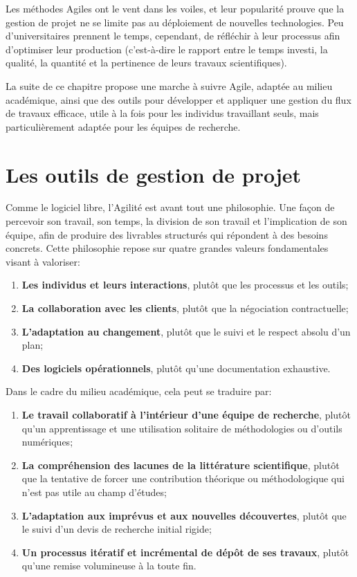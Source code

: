 \documentclass[
  letterpaper,
  DIV=11,
  numbers=noendperiod]{scrreprt}
\providecommand{\tightlist}{%
  \setlength{\itemsep}{0pt}\setlength{\parskip}{0pt}}\usepackage{longtable,booktabs,array}
\begin{document}
Les méthodes Agiles ont le vent dans les voiles, et leur popularité
prouve que la gestion de projet ne se limite pas au déploiement de
nouvelles technologies. Peu d'universitaires prennent le temps,
cependant, de réfléchir à leur processus afin d'optimiser leur
production (c'est-à-dire le rapport entre le temps investi, la qualité,
la quantité et la pertinence de leurs travaux scientifiques).

La suite de ce chapitre propose une marche à suivre Agile, adaptée au
milieu académique, ainsi que des outils pour développer et appliquer une
gestion du flux de travaux efficace, utile à la fois pour les individus
travaillant seuls, mais particulièrement adaptée pour les équipes de
recherche.

\section{Les outils de gestion de
projet}\label{les-outils-de-gestion-de-projet}

Comme le logiciel libre, l'Agilité est avant tout une philosophie. Une
façon de percevoir son travail, son temps, la division de son travail et
l'implication de son équipe, afin de produire des livrables structurés
qui répondent à des besoins concrets. Cette philosophie repose sur
quatre grandes valeurs fondamentales visant à valoriser:

\begin{enumerate}
\def\labelenumi{\arabic{enumi}.}
\tightlist
\item
  \textbf{Les individus et leurs interactions}, plutôt que les processus
  et les outils;
\item
  \textbf{La collaboration avec les clients}, plutôt que la négociation
  contractuelle;
\item
  \textbf{L'adaptation au changement}, plutôt que le suivi et le respect
  absolu d'un plan;
\item
  \textbf{Des logiciels opérationnels}, plutôt qu'une documentation
  exhaustive.
\end{enumerate}

Dans le cadre du milieu académique, cela peut se traduire par:

\begin{enumerate}
\def\labelenumi{\arabic{enumi}.}
\tightlist
\item
  \textbf{Le travail collaboratif à l'intérieur d'une équipe de
  recherche}, plutôt qu'un apprentissage et une utilisation solitaire de
  méthodologies ou d'outils numériques;
\item
  \textbf{La compréhension des lacunes de la littérature scientifique},
  plutôt que la tentative de forcer une contribution théorique ou
  méthodologique qui n'est pas utile au champ d'études;
\item
  \textbf{L'adaptation aux imprévus et aux nouvelles découvertes},
  plutôt que le suivi d'un devis de recherche initial rigide;
\item
  \textbf{Un processus itératif et incrémental de dépôt de ses travaux},
  plutôt qu'une remise volumineuse à la toute fin.
\end{enumerate}
\end{document}
